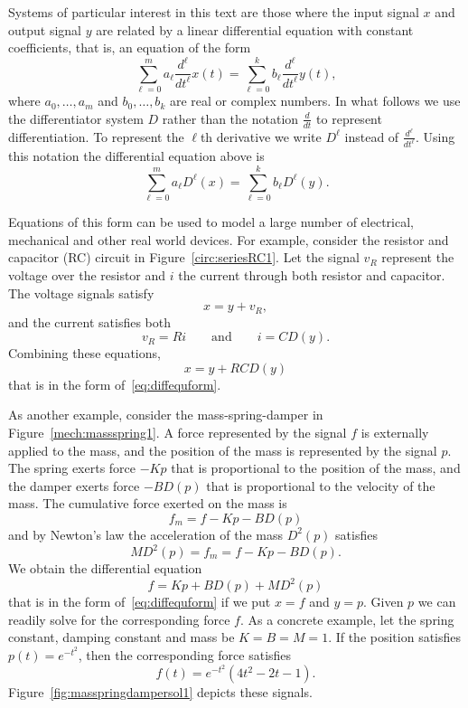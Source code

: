 Systems of particular interest in this text are those where the input signal $x$ and output signal $y$ are related by a linear differential equation with constant coefficients, that is, an equation of the form
\[
\sum_{\ell=0}^{m} a_\ell \frac{d^\ell}{d t^\ell} x(t) = \sum_{\ell=0}^{k} b_\ell \frac{d^\ell}{d t^\ell} y(t),
\]
where $a_0,\dots,a_m$ and $b_0,\dots,b_k$ are real or complex numbers.  In what follows we use the differentiator system $D$ rather than the notation $\frac{d}{d t}$ to represent differentiation.  To represent the $\ell$th derivative we write $D^\ell$ instead of  $\frac{d^\ell}{d t^\ell}$.  Using this notation the differential equation above is
\begin{equation}\label{eq:diffequform}
\sum_{\ell=0}^{m} a_\ell D^\ell(x) = \sum_{\ell=0}^{k} b_\ell D^\ell(y). 
\end{equation}

Equations of this form can be used to model a large number of electrical, mechanical and other real world devices.  For example, consider the resistor and capacitor (RC) circuit in Figure~\ref{circ:seriesRC1}.  Let the signal $v_R$ represent the voltage over the resistor and $i$ the current through both resistor and capacitor.  The voltage signals satisfy
\[
x = y + v_R,
\]
and the current satisfies both
\[
v_R = R i \qquad \text{and} \qquad i = C D(y).
\]
Combining these equations,
\begin{equation}\label{eq:RCdiffeq}
x = y + RC D(y)
\end{equation}
that is in the form of~\eqref{eq:diffequform}.

As another example, consider the mass-spring-damper in Figure~\ref{mech:massspring1}.  A force represented by the signal $f$ is externally applied to the mass, and the position of the mass is represented by the signal $p$.  The spring exerts force $-K p$ that is proportional to the position of the mass, and the damper exerts force $-B D(p)$ that is proportional to the velocity of the mass.  The cumulative force exerted on the mass is
\[
f_m = f - K p - B D(p)
\]
and by Newton's law the acceleration of the mass $D^2(p)$ satisfies
\[
M D^2(p) = f_m = f - K p - B D(p).
\]
We obtain the differential equation
\begin{equation}\label{eq:diffeqmasspringdamper}
f = K p + B D(p) + M D^2(p)
\end{equation}
that is in the form of~\eqref{eq:diffequform} if we put $x = f$ and $y = p$.   Given $p$ we can readily solve for the corresponding force $f$.  As a concrete example, let the spring constant, damping constant and mass be $K=B=M=1$.  If the position satisfies $p(t) = e^{-t^2}$, then the corresponding force satisfies
\[
f(t) = e^{-t^2} (4 t^2-2 t-1).
\]
Figure~\ref{fig:masspringdampersol1} depicts these signals.

